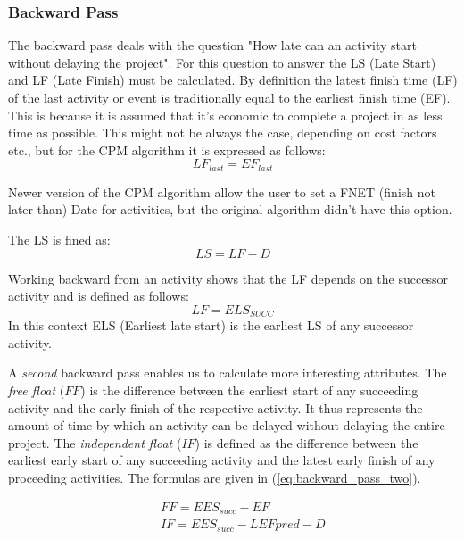 \subsubsection{Backward Pass}
The backward pass deals with the question "How late can an activity start without delaying the project".
For this question to answer the LS (Late Start) and LF (Late Finish) must be calculated.
By definition the latest finish time (LF) of the last activity or event is traditionally equal to the earliest finish time (EF). This is because it is assumed that it's economic to complete a project in as less time as possible. This might not be always the case, depending on cost factors etc., but for the CPM algorithm it is expressed as follows:
\begin{equation}
LF_{last} = EF_{last}
\end{equation}
 
Newer version of the CPM algorithm allow the user to set a FNET (finish not later than) Date for activities, but the original algorithm didn't have this option.
 
 
The LS is fined as:
\begin{equation}
LS = LF - D
\end{equation}
 
Working backward from an activity shows that the LF depends on the successor activity and is defined as follows:
\begin{equation}
LF = ELS_{SUCC}
\end{equation}
In this context ELS (Earliest late start) is the earliest LS of any successor activity.

A \emph{second} backward pass enables us to calculate more interesting attributes. The \emph{free
float} ($FF$) is the difference between the earliest start of any succeeding activity and the early
finish of the respective activity. It thus represents the amount of time by which an activity can be
delayed without delaying the entire project.  The \emph{independent float} ($IF$) is defined as the
difference between the earliest early start of any succeeding activity and the latest early finish 
of any proceeding activities. The formulas are given in (\ref{eq:backward_pass_two}).

\begin{eqnarray}
&& FF=EES_{succ}-EF \nonumber\\
&& IF=EES_{succ}-LEF{pred}-D \\
\label{eq:backward_pass_two}
\end{eqnarray}
 
